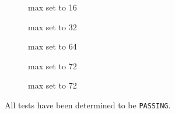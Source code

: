 \documentclass[11pt,letterpaper]{report}
\begin{document}
\begin{itemize}
\begin{figure}[h!]
	\centering
	\caption[ctrlpps]{max set to 16}
	\label{fig:setmax16}
\end{figure}

\begin{figure}[h!]
	\centering
	\caption[ctrlpps]{max set to 32}
	\label{fig:setmax32}
\end{figure}

\begin{figure}[h!]
	\centering
	\caption[ctrlpps]{max set to 64}
	\label{fig:setmax64}
\end{figure}

\begin{figure}[h!]
	\centering
	\caption[ctrlpps]{max set to 72}
	\label{fig:setmax721}
\end{figure}

\begin{figure}[h!]
	\centering
	\caption[ctrlpps]{max set to 72}
	\label{fig:setmax722}
\end{figure}

	\end{itemize}

	All tests have been determined to be {\tt PASSING}.
\end{document}
